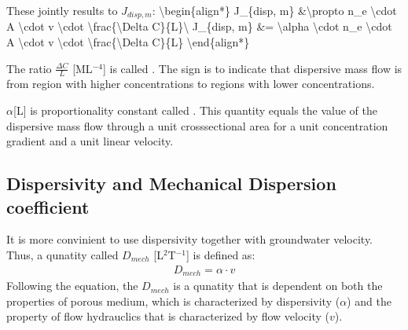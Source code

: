 \documentclass[letterpaper,10pt,english]{jupyterBook}
\begin{document}
\sphinxAtStartPar
These jointly results to \(J_{disp, m}\):
\textbackslash{}begin\{align*\}
J\_\{disp, m\} \&\textbackslash{}propto \sphinxhyphen{}n\_e \textbackslash{}cdot A \textbackslash{}cdot v \textbackslash{}cdot \textbackslash{}frac\{\textbackslash{}Delta C\}\{L\}\textbackslash{}
J\_\{disp, m\} \&= \sphinxhyphen{} \textbackslash{}alpha \textbackslash{}cdot n\_e \textbackslash{}cdot A \textbackslash{}cdot v \textbackslash{}cdot \textbackslash{}frac\{\textbackslash{}Delta C\}\{L\}
\textbackslash{}end\{align*\}

\sphinxAtStartPar
The ratio \(\frac{\Delta C}{L}\) {[}ML\(^{-4}\){]} is called . The  sign is to indicate that dispersive mass flow is from region with higher concentrations to regions with lower concentrations.

\sphinxAtStartPar
\(\alpha\){[}L{]} is proportionality constant called . This quantity equals the value of the dispersive mass flow through a unit cross\sphinxhyphen{}sectional area for a unit concentration gradient and a unit linear velocity.


\subsection{Dispersivity and Mechanical Dispersion coefficient}
\label{\detokenize{content/transport/L9/21_conservative_transport:dispersivity-and-mechanical-dispersion-coefficient}}
\sphinxAtStartPar
It is more convinient to use dispersivity together with groundwater velocity. Thus, a qunatity called  \(D_{mech}\) {[}L\(^2\)T\(^{-1}\){]} is defined as:
\begin{equation*}
\begin{split}
D_{mech} = \alpha \cdot v
\end{split}
\end{equation*}
\sphinxAtStartPar
Following the equation, the \(D_{mech}\) is a qunatity that is dependent on both the properties of porous medium, which is characterized by dispersivity (\(\alpha\)) and the property of flow hydrauclics that is characterized by flow velocity (\(v\)).
\end{document}
